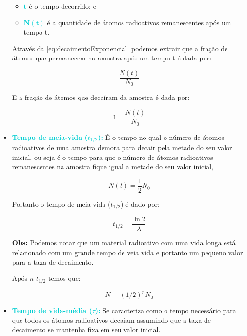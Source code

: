 \documentclass[11pt,a4paper]{article}
\newcounter{exemplo}
\begin{document}
\begin{itemize}
\begin{exemplo}[onde,]
\begin{itemize}
					\item \textcolor{DarkTurquoise}{$\mathbf{t}$} é o tempo decorrido; e

					\item \textcolor{DarkTurquoise}{$\mathbf{N(t)}$} é a quantidade de átomos radioativos remanescentes após um tempo t.
				\end{itemize}
				\end{exemplo}
				Através da   \ref{eq:decaimentoExponencial} podemos extrair que a fração de átomos que permanecem na amostra após um tempo t é dada por:

				\begin{equation}
					\frac{N(t)}{N_0}
				\end{equation}

				E a fração de átomos que decaíram da amostra é dada por:

				\begin{equation}
					1 - \frac{N(t)}{N_0}
				\end{equation}

			\item \textcolor{DarkTurquoise}{\textbf{Tempo de meia-vida ($t_{1/2}$):}} É o tempo no qual o número de átomos radioativos de uma amostra demora para decair pela metade do seu valor inicial, ou seja é o tempo para que o número de átomos radioativos remanescentes na amostra fique igual a metade do seu valor inicial, 
			
				\begin{equation}
					N(t) = \frac{1}{2}N_0
				\end{equation}

				Portanto o tempo de meia-vida  ($t_{1/2}$) é dado por:

				\begin{equation}
					t_{1/2} = \frac{\ln 2}{\lambda}
				\end{equation}

				\textbf{\textcolor{CarnationPink}{Obs:} } Podemos notar que um material radioativo com uma vida longa está relacionado com um grande tempo de veia vida e portanto um pequeno valor para a taxa de decaimento.

				Após $n$ $t_{1/2}$ temos que:

				\begin{equation}
					N = \left({1/2}\right)^n N_0
				\end{equation}

			\item \textcolor{DarkTurquoise}{\textbf{Tempo de vida-média ($\tau$):}} Se caracteriza como o tempo necessário para que todos os átomos radioativos decaiam assumindo que a taxa de decaimento se mantenha fixa em seu valor inicial.
			

\end{itemize}
\end{document}
